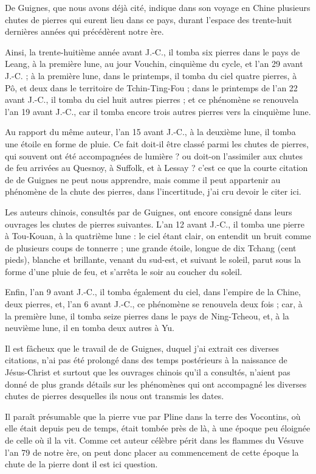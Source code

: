 \documentclass[a4paper, 12pt, oneside, french]{article}
\begin{document}
De Guignes, que nous avons déjà cité, indique dans son voyage en Chine plusieurs chutes de pierres qui eurent lieu dans ce pays, durant l'espace des trente-huit dernières années qui précédèrent notre ère.

Ainsi, la trente-huitième année avant J.-C., il tomba six pierres dans le pays de Leang, à la première lune, au jour Vouchin, cinquième du cycle, et l'an 29 avant J.-C. ; à la première lune, dans le printemps, il tomba du ciel quatre pierres, à Pô, et deux dans le territoire de Tchin-Ting-Fou ; dans le printemps de l'an 22 avant J.-C., il tomba du ciel huit autres pierres ; et ce phénomène se renouvela l'an 19 avant J.-C., car il tomba encore trois autres pierres vers la cinquième lune.

Au rapport du même auteur, l'an 15 avant J.-C., à la deuxième lune, il tomba une étoile en forme de pluie. Ce fait doit-il être classé parmi les chutes de pierres, qui souvent ont été accompagnées de lumière ? ou doit-on l'assimiler aux chutes de feu arrivées au Quesnoy, à Suffolk, et à Lessay ? c'est ce que la courte citation de de Guignes ne peut nous apprendre, mais comme il peut appartenir au phénomène de la chute des pierres, dans l'incertitude, j'ai cru devoir le citer ici.

Les auteurs chinois, consultés par de Guignes, ont encore consigné dans leurs ouvrages les chutes de pierres suivantes. L'an 12 avant J.-C., il tomba une pierre à Tou-Kouan, à la quatrième lune : le ciel étant clair, on entendit un bruit comme de plusieurs coups de tonnerre ; une grande étoile, longue de dix Tchang (cent pieds), blanche et brillante, venant du sud-est, et suivant le soleil, parut sous la forme d'une pluie de feu, et s'arrêta le soir au coucher du soleil.

Enfin, l'an 9 avant J.-C., il tomba également du ciel, dans l'empire de la Chine, deux pierres, et, l'an 6 avant J.-C., ce phénomène se renouvela deux fois ; car, à la première lune, il tomba seize pierres dans le pays de Ning-Tcheou, et, à la neuvième lune, il en tomba deux autres à Yu.

Il est fâcheux que le travail de de Guignes, duquel j'ai extrait ces diverses citations, n'ai pas été prolongé dans des temps postérieurs à la naissance de Jésus-Christ et surtout que les ouvrages chinois qu'il a consultés, n'aient pas donné de plus grands détails sur les phénomènes qui ont accompagné les diverses chutes de pierres desquelles ils nous ont transmis les dates.

Il paraît présumable que la pierre vue par Pline dans la terre des Vocontins, où elle était depuis peu de temps, était tombée près de là, à une époque peu éloignée de celle où il la vit. Comme cet auteur célèbre périt dans les flammes du Vésuve l'an 79 de notre ère, on peut donc placer au commencement de cette époque la chute de la pierre dont il est ici question.
\end{document}
